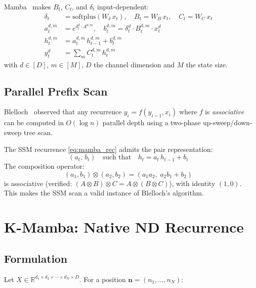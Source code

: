 \documentclass[10pt,onecolumn]{article}
\begin{document}
Mamba~\cite{mamba2023} makes $B_t$, $C_t$, and $\delta_t$ input-dependent:
\begin{align}
  \delta_t &= \text{softplus}(W_\delta\, x_t), \quad
  B_t = W_B\, x_t, \quad
  C_t = W_C\, x_t \\
  a_t^{d,m} &= e^{\delta_t^d \cdot A^{d,m}}, \quad
  b_t^{d,m}  = \delta_t^d \cdot B_t^{d,m} \cdot x_t^d \label{eq:mamba_ab}\\
  h_t^{d,m} &= a_t^{d,m}\,h_{t-1}^{d,m} + b_t^{d,m} \label{eq:mamba_rec}\\
  y_t^d     &= \textstyle\sum_m C_t^{d,m}\,h_t^{d,m} \label{eq:mamba_out}
\end{align}
with $d \in [D]$, $m \in [M]$, $D$ the channel dimension and $M$ the state size.

\subsection{Parallel Prefix Scan}
\label{sec:blelloch_bg}

Blelloch~\cite{blelloch1990} observed that any recurrence
$y_i = f(y_{i-1}, x_i)$ where $f$ is \emph{associative} can be
computed in $O(\log n)$ parallel depth using a two-phase
up-sweep/down-sweep tree scan.

The SSM recurrence \eqref{eq:mamba_rec} admits the pair representation:
\begin{equation}
  (a_t,\, b_t) \quad\text{such that}\quad h_t = a_t\,h_{t-1} + b_t
\end{equation}
The composition operator:
\begin{equation}
  \boxed{(a_1, b_1) \otimes (a_2, b_2) = (a_1 a_2,\; a_2 b_1 + b_2)}
  \label{eq:monoid}
\end{equation}
is associative (verified: $(A \otimes B) \otimes C = A \otimes (B \otimes C)$),
with identity $(1, 0)$.
This makes the SSM scan a valid instance of Blelloch's algorithm.

\section{K-Mamba: Native ND Recurrence}
\label{sec:theory}

\subsection{Formulation}

Let $X \in \mathbb{R}^{d_1 \times d_2 \times \cdots \times d_N \times D}$.
For a position $\mathbf{n} = (n_1, \ldots, n_N)$:
\end{document}
